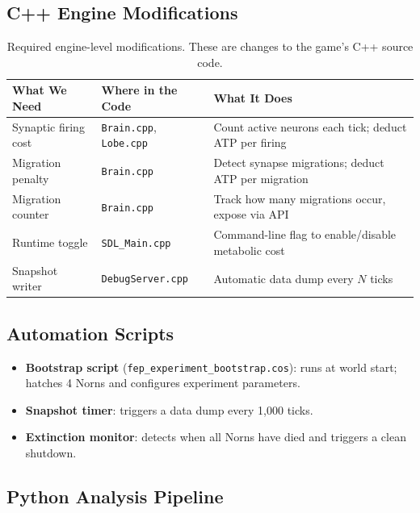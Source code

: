 \documentclass[12pt, a4paper]{article}
\begin{document}
\subsection{C++ Engine Modifications}

\begin{table}[H]
\centering
\caption{Required engine-level modifications. These are changes to the game's C++ source code.}
\label{tab:engine-mods}
\begin{tabular}{@{}p{3.5cm}p{4cm}p{5.5cm}@{}}
\toprule
\textbf{What We Need} & \textbf{Where in the Code} & \textbf{What It Does} \\
\midrule
Synaptic firing cost & \texttt{Brain.cpp}, \texttt{Lobe.cpp} & Count active neurons each tick; deduct ATP per firing \\
Migration penalty & \texttt{Brain.cpp} & Detect synapse migrations; deduct ATP per migration \\
Migration counter & \texttt{Brain.cpp} & Track how many migrations occur, expose via API \\
Runtime toggle & \texttt{SDL\_Main.cpp} & Command-line flag to enable/disable metabolic cost \\
Snapshot writer & \texttt{DebugServer.cpp} & Automatic data dump every $N$ ticks \\
\bottomrule
\end{tabular}
\end{table}

\subsection{Automation Scripts}

\begin{itemize}[nosep]
  \item \textbf{Bootstrap script} (\texttt{fep\_experiment\_bootstrap.cos}): runs at world start; hatches 4 Norns and configures experiment parameters.
  \item \textbf{Snapshot timer}: triggers a data dump every 1{,}000 ticks.
  \item \textbf{Extinction monitor}: detects when all Norns have died and triggers a clean shutdown.
\end{itemize}

\subsection{Python Analysis Pipeline}
\end{document}
